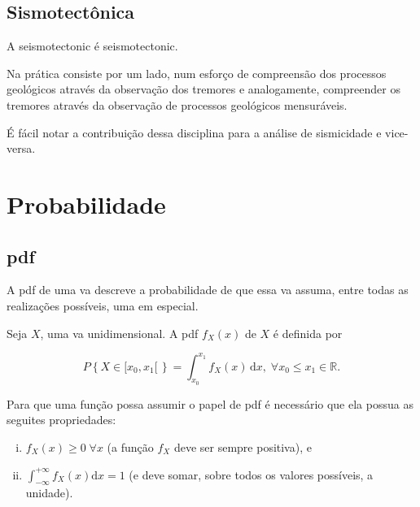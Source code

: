 \subsection{Sismotectônica}
\label{sec:sismotectonica}

A \gls{seismotectonic} é \glsdesc*{seismotectonic}. 

Na prática consiste por um lado, num esforço de compreensão dos
processos geológicos através da observação dos tremores e analogamente, compreender os tremores através da observação
de processos geológicos mensuráveis.  

É fácil notar a contribuição dessa disciplina para a análise de sismicidade e vice-versa.







\section{Probabilidade}
\label{sec:probabilidade}



\subsection{\Glsdesc{pdf}}
\label{sec:pdf}

A \gls{pdf} de uma \gls{va}  
descreve a probabilidade de que essa \gls{va} 
assuma, entre todas as realizações possíveis, uma em especial.

Seja $X$, uma \gls{va} unidimensional. A \gls{pdf}
$f_X(x)$ de $X$ é definida por

\begin{equation}
	P \left\{ X \in [x_0,x_1[\, \right\} = \int_{x_0}^{x_1}\!f_X(x)\,\mathrm{d}x, \; \forall x_0 \leq x_1 \in \mathbb{R}.
	\label{eq:pdf}
\end{equation}

Para que uma função possa assumir o papel de \gls{pdf} é necessário que ela
possua as seguites propriedades:
\begin{enumerate}[(i)]
	\item $f_X(x) \ge 0\;\forall x$  (a função $f_X$ deve ser sempre positiva), e
	\item $\int_{-\infty}^{+\infty} f_X(x) \mathrm{d}x = 1$ (e deve somar, sobre todos os valores possíveis, a unidade).
\end{enumerate}


